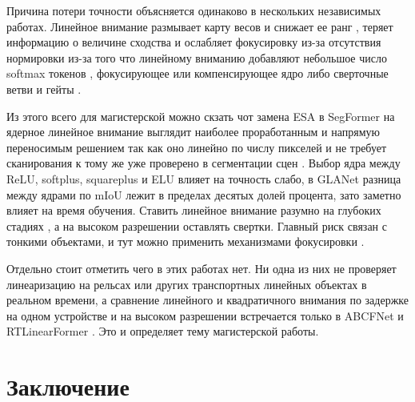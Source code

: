 \documentclass[areasetadvanced]{scrartcl}
\begin{document}
		Причина потери точности объясняется одинаково в нескольких независимых работах. Линейное внимание размывает карту весов и снижает ее ранг
		\cite{hlsmvit}, теряет информацию о величине сходства \cite{uuekan} и ослабляет фокусировку из-за отсутствия нормировки \cite{glanet} 
		из-за того что линейному вниманию добавляют небольшое число softmax токенов \cite{hlsmvit}, фокусирующее или компенсирующее ядро
		\cite{mslcfnet, uuekan} либо сверточные ветви и гейты \cite{mlformer, rtlinearformer}.

		Из этого всего для магистерской можно скзать чот замена ESA в SegFormer на ядерное линейное внимание выглядит наиболее проработанным
		и напрямую переносимым решением так как оно линейно по числу пикселей и  не требует сканирования к тому же уже проверено в сегментации сцен
		\cite{rtlinearformer, lsnet}. Выбор ядра между ReLU, softplus, squareplus и ELU влияет на точность слабо, в GLANet \cite{glanet} разница между
		ядрами по mIoU лежит в пределах десятых долей процента, зато заметно влияет на время обучения. Ставить линейное внимание разумно на глубоких
		стадиях \cite{glanet, rtlinearformer, hlsmvit}, а на высоком разрешении оставлять свертки. Главный риск связан с тонкими объектами, и тут
		можно применить механизмами фокусировки \cite{hlsmvit, uuekan}.

		Отдельно стоит отметить чего в этих работах нет. Ни одна из них не проверяет линеаризацию на рельсах или других транспортных линейных объектах в
		реальном времени, а сравнение линейного и квадратичного внимания по задержке на одном устройстве и на высоком разрешении встречается только в
		ABCFNet \cite{abcfnet} и RTLinearFormer \cite{rtlinearformer}. Это и определяет тему магистерской работы.

\newpage
\section*{Заключение}
\end{document}
